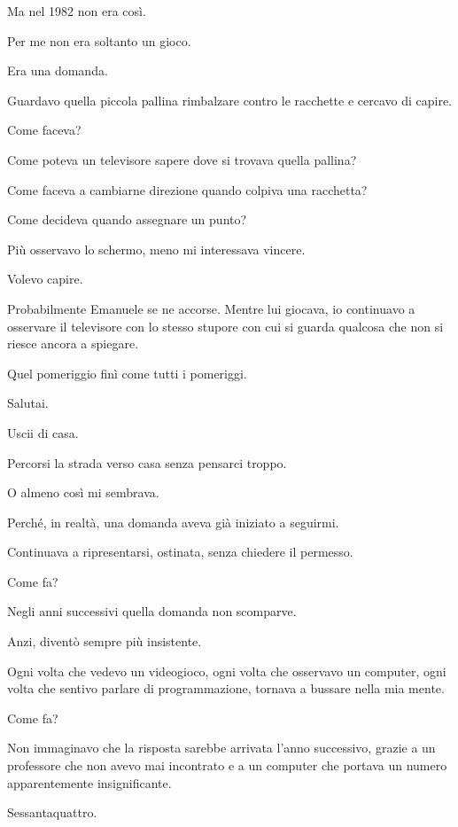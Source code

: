 \documentclass{article}
\begin{document}
Ma nel 1982 non era così.

Per me non era soltanto un gioco.

Era una domanda.

Guardavo quella piccola pallina rimbalzare contro le racchette e cercavo di capire.

Come faceva?

Come poteva un televisore sapere dove si trovava quella pallina?

Come faceva a cambiarne direzione quando colpiva una racchetta?

Come decideva quando assegnare un punto?

Più osservavo lo schermo, meno mi interessava vincere.

Volevo capire.

Probabilmente Emanuele se ne accorse. Mentre lui giocava, io continuavo a osservare il televisore con lo stesso stupore
con cui si guarda qualcosa che non si riesce ancora a spiegare.

Quel pomeriggio finì come tutti i pomeriggi.

Salutai.

Uscii di casa.

Percorsi la strada verso casa senza pensarci troppo.

O almeno così mi sembrava.

Perché, in realtà, una domanda aveva già iniziato a seguirmi.

Continuava a ripresentarsi, ostinata, senza chiedere il permesso.

Come fa?

Negli anni successivi quella domanda non scomparve.

Anzi, diventò sempre più insistente.

Ogni volta che vedevo un videogioco, ogni volta che osservavo un computer, ogni volta che sentivo parlare di
programmazione, tornava a bussare nella mia mente.

Come fa?

Non immaginavo che la risposta sarebbe arrivata l'anno successivo, grazie a un professore che non avevo mai incontrato e
a un computer che portava un numero apparentemente insignificante.

Sessantaquattro.


\bigskip
\end{document}
